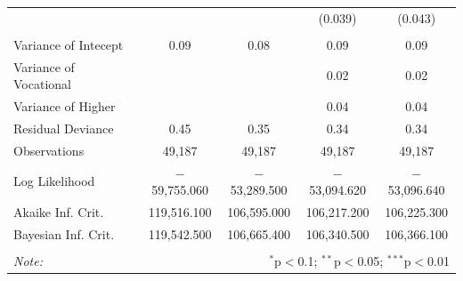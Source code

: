 \documentclass[12pt,a4paper]{article}
\numberwithin{equation}{section}
\begin{document}
\begin{table}[!htbp]
\begin{tabular}{@{\extracolsep{5pt}}lcccc}
		&  &  & (0.039) & (0.043) \\ 
		& & & & \\ 
		\hline
		\hline
		Variance of Intecept & 0.09 & 0.08 & 0.09 & 0.09 \\ 
		Variance of Vocational &  &  & 0.02 & 0.02 \\ 
		Variance of Higher &  &  & 0.04 & 0.04 \\ 
		Residual Deviance & 0.45 & 0.35 & 0.34 & 0.34 \\ 
		\hline
		\hline
		Observations & 49,187 & 49,187 & 49,187 & 49,187 \\ 
		Log Likelihood & $-$59,755.060 & $-$53,289.500 & $-$53,094.620 & $-$53,096.640 \\ 
		Akaike Inf. Crit. & 119,516.100 & 106,595.000 & 106,217.200 & 106,225.300 \\ 
		Bayesian Inf. Crit. & 119,542.500 & 106,665.400 & 106,340.500 & 106,366.100 \\ 
		\hline 
		\hline \\[-1.8ex] 
		\textit{Note:}  & \multicolumn{4}{r}{$^{*}$p$<$0.1; $^{**}$p$<$0.05; $^{***}$p$<$0.01} \\ 
	\end{tabular} 
\end{table} 
\end{document}
